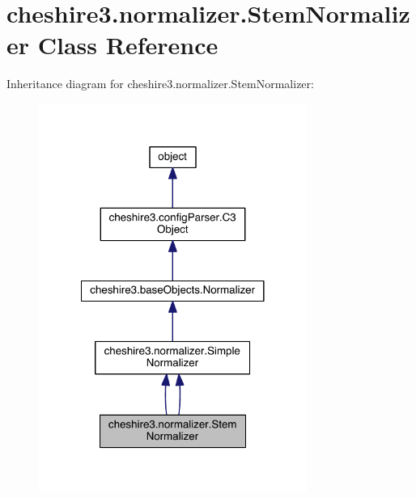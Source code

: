 \hypertarget{classcheshire3_1_1normalizer_1_1_stem_normalizer}{\section{cheshire3.\-normalizer.\-Stem\-Normalizer Class Reference}
\label{classcheshire3_1_1normalizer_1_1_stem_normalizer}
}


Inheritance diagram for cheshire3.\-normalizer.\-Stem\-Normalizer\-:
\nopagebreak
\begin{figure}[H]
\begin{center}
\leavevmode
\includegraphics[width=248pt]{classcheshire3_1_1normalizer_1_1_stem_normalizer__inherit__graph}
\end{center}
\end{figure}


